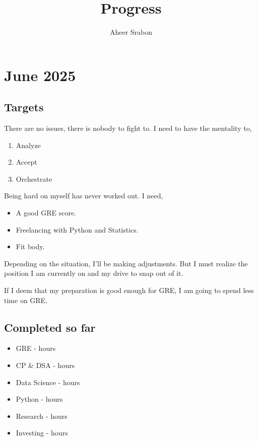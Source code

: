 \documentclass[11pt]{article}
\title{Progress}
\author{Aheer Srabon}
\date{}
\begin{document}
\maketitle

\section*{June 2025}



\subsection*{Targets}
\noindent There are no issues, there is nobody to fight to. I need to have the mentality to,

\begin{enumerate}
\itemsep0em
  \item Analyze
  \item Accept
  \item Orchestrate
\end{enumerate}

\noindent Being hard on myself has never worked out. I need,

\begin{itemize}
\itemsep0em
  \item A good GRE score.
  \item Freelancing with Python and Statistics.
  \item Fit body.
\end{itemize}

\noindent Depending on the situation, I'll be making adjustments. But I must realize the position I am currently
on and my drive to snap out of it.

\noindent If I deem that my preparation is good enough for GRE, I am going to spend less time on GRE.

\subsection*{Completed so far}
\begin{itemize}
\itemsep0em
  \item GRE           - \juneGRE hours
  \item CP \& DSA     - \juneDSACP hours
  \item Data Science  - \juneDS hours
  \item Python        - \junePYTHON hours
  \item Research      - \juneRESEARCH hours
  \item Investing     - \juneINVEST hours
\end{itemize}
\end{document}

